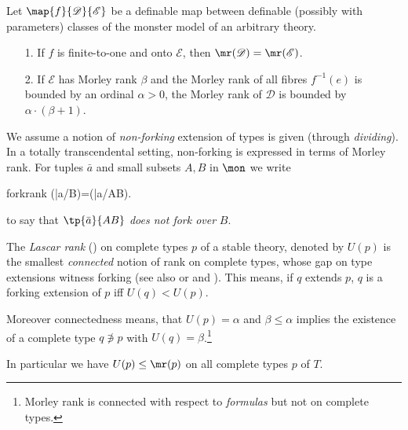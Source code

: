 \begin{fact}\label{ziemr}
Let $\map{f}{\mathscr{D}}{\mathscr{E}}$ be a definable map between definable (possibly with parameters) classes of the monster
model of an arbitrary theory.

\begin{itemize}
\item[1.]If $f$ is finite-to-one and onto $\mathscr{E}$, then $\mr(\mathscr{D})=\mr(\mathscr{E})$.
\item[2.]If $\mathscr{E}$ has Morley rank $\beta$ and the Morley rank of all fibres $f^{-1}(e)$ is bounded by an ordinal $\alpha>0$, the Morley rank of $\mathscr{D}$ is bounded by $\alpha\cdot(\beta+1)$.
\end{itemize}
\end{fact}

\medskip
We assume a notion of {\em non-forking} extension of types is given (through {\em dividing}).
In a totally transcendental setting, non-forking is expressed in terms of Morley rank.
For tuples $\bar a$ and small subsets $A,B$ in $\mon$ we write
\begin{labeq}{forkrank}
\iff\mr(\bar a/B)=\mr(\bar a/AB).
\end{labeq}
to say that $\tp{\bar a}{AB}$ {\em does not fork over} $B$.
 
The {\em Lascar rank} (\cite{las}) on complete types $p$ of a stable theory, denoted by $U(p)$ is the smallest {\em connected} notion
of rank on complete types, whose gap on type extensions witness forking (see also \cite{haha} or and \cite[\S6]{bue}).
This means, if $q$ extends $p$, $q$ is a forking extension of $p$ iff $U(q)<U(p)$.

Moreover connectedness means, that $U(p)=\alpha$ and $\beta\leq\alpha$ implies the existence of a
complete type $q\nni p$ with $U(q)=\beta$.\footnote{Morley rank is connected with respect to {\em formulas} but
not on complete types.}

In particular we have $U(p)\leq\mr(p)$ on all complete types $p$ of $T$.

